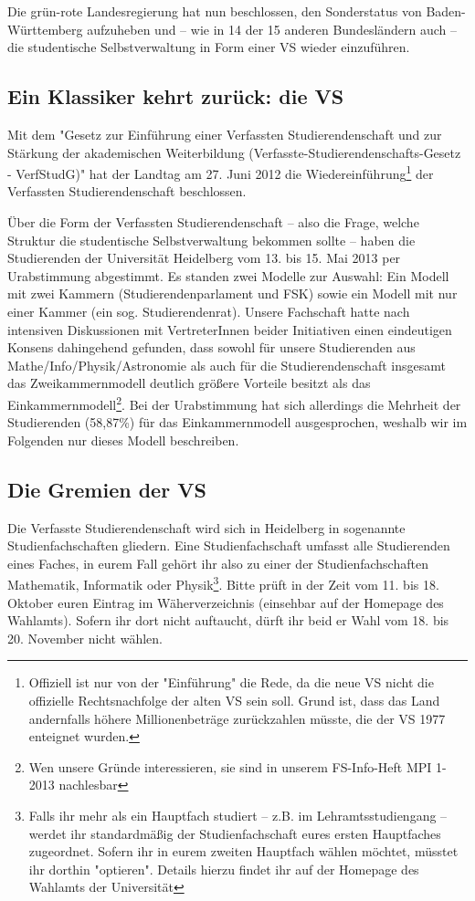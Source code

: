 Die grün-rote Landesregierung hat nun beschlossen, den Sonderstatus von
Baden-Württemberg aufzuheben und -- wie in 14 der 15 anderen Bundesländern
auch -- die studentische Selbstverwaltung in Form einer VS wieder einzuführen.


\subsection{Ein Klassiker kehrt zurück: die VS}

Mit dem "Gesetz zur Einführung einer Verfassten Studierendenschaft und
zur Stärkung der akademischen Weiterbildung
(Verfasste-Studierendenschafts-Gesetz - VerfStudG)" hat der Landtag am 27. Juni 2012
die Wiedereinführung\footnote{Offiziell ist nur von der "Einführung" die
Rede, da die neue VS nicht die offizielle Rechtsnachfolge der alten VS sein soll.
Grund ist, dass das Land andernfalls höhere Millionenbeträge zurückzahlen müsste,
die der VS 1977 enteignet wurden.} der Verfassten Studierendenschaft beschlossen.

Über die Form der Verfassten Studierendenschaft -- also die Frage, welche
Struktur die studentische Selbstverwaltung bekommen sollte -- haben die Studierenden
der Universität Heidelberg vom 13. bis 15. Mai 2013 per Urabstimmung abgestimmt.
Es standen zwei Modelle zur Auswahl: Ein Modell mit zwei
Kammern (Studierendenparlament und FSK) sowie ein Modell mit nur einer
Kammer (ein sog. Studierendenrat). Unsere Fachschaft hatte nach intensiven Diskussionen mit
VertreterInnen beider Initiativen einen eindeutigen
Konsens dahingehend gefunden, dass sowohl für unsere Studierenden aus
Mathe/Info/Physik/Astronomie als auch für die Studierendenschaft
insgesamt das Zweikammernmodell deutlich größere Vorteile besitzt als
das Einkammernmodell\footnote{Wen unsere Gründe interessieren, sie sind in unserem FS-Info-Heft MPI 1-2013 nachlesbar}.
Bei der Urabstimmung hat sich allerdings die Mehrheit der Studierenden (58,87\%)
für das Einkammernmodell ausgesprochen, weshalb wir im Folgenden nur dieses Modell beschreiben.



\subsection{Die Gremien der VS}

Die Verfasste Studierendenschaft wird sich in Heidelberg in sogenannte
Studienfachschaften gliedern. Eine Studienfachschaft umfasst alle
Studierenden eines Faches, in eurem Fall gehört ihr also zu einer der
Studienfachschaften Mathematik, Informatik oder Physik\footnote{Falls ihr
mehr als ein Hauptfach studiert -- z.B. im Lehramtsstudiengang -- werdet
ihr standardmäßig der Studienfachschaft eures ersten Hauptfaches zugeordnet.
Sofern ihr in eurem zweiten Hauptfach wählen möchtet, müsstet ihr dorthin "optieren".
Details hierzu findet ihr auf der Homepage des Wahlamts der Universität}.
Bitte prüft in der Zeit vom 11. bis 18. Oktober euren Eintrag im Wäherverzeichnis
(einsehbar auf der Homepage des Wahlamts). Sofern ihr dort nicht auftaucht,
dürft ihr beid er Wahl vom 18. bis 20. November nicht wählen.

